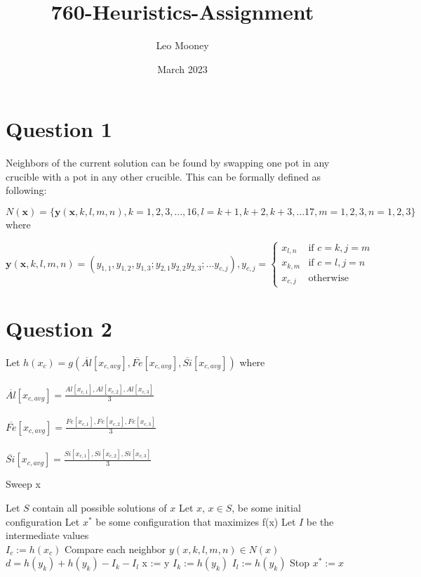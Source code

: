 \documentclass{article}
\title{760-Heuristics-Assignment}
\author{Leo Mooney}
\date{March 2023}
\begin{document}
\maketitle

\section{Question 1}
Neighbors of the current solution can be found by swapping one pot in
any crucible with a pot in any other crucible.
This can be formally defined as following:

$N(\mathbf{x}) = \{\mathbf{y}(\mathbf{x}, k, l, m, n), k=1,2,3,...,16, 
l=k+1,k+2,k+3,...17, m=1,2,3, n=1,2,3\}$ where

$$\mathbf{y}(\mathbf{x},k,l,m,n)=(y_{1, 1},y_{1, 2},y_{1, 3};
y_{2, 1}y_{2, 2}y_{2, 3};...y_{c, j}),y_{c,j}=
\begin{cases}
    x_{l, n} & \text{if } c=k,j=m \\
    x_{k, m} & \text{if } c=l,j=n \\
    x_{c,j} & \text{otherwise}
\end{cases}$$

\clearpage
\section{Question 2}
Let $h(x_c) = g(\overline{Al}[x_{c,avg}], \overline{Fe}[x_{c,avg}], \overline{Si}[x_{c, avg}])$ where \\\\
$\overline{Al}[x_{c,avg}] = \displaystyle\frac{Al[x_{c,1}], Al[x_{c,2}], Al[x_{c,3}]}{3}$\\\\
$\overline{Fe}[x_{c,avg}] = \displaystyle\frac{Fe[x_{c,1}], Fe[x_{c,2}], Fe[x_{c,3}]}{3}$\\\\
$\overline{Si}[x_{c,avg}] = \displaystyle\frac{Si[x_{c,1}], Si[x_{c,2}], Si[x_{c,3}]}{3}$

\begin{algorithm}
\caption{Sweep x}
\begin{algorithmic}
  \STATE Let $S$ contain all possible solutions of $x$
  \STATE Let $x$, $x \in S$, be some initial configuration
  \STATE Let $x^*$ be some configuration that maximizes f(x)
  \STATE Let $I$ be the intermediate values\\
  \STATE $I_c := h(x_c)$
    \STATE Compare each neighbor $y(x, k, l, m, n) \in  N(x)$
    \STATE $d = h(y_k) + h(y_k) - I_k - I_l$
      \STATE x := y
      \STATE $I_k := h(y_k)$ 
      \STATE $I_l := h(y_k)$ 
      \STATE Stop
    \ENDIF
  \ENDWHILE
  \STATE $x^* := x$
\end{algorithmic}
\end{algorithm}
\end{document}
